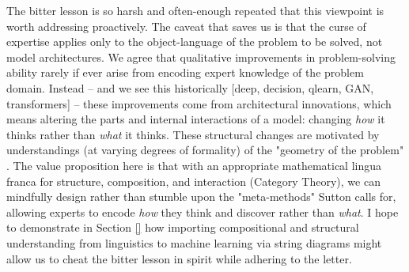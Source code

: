 
The bitter lesson is so harsh and often-enough repeated that this viewpoint is worth addressing proactively. The caveat that saves us is that the curse of expertise applies only to the object-language of the problem to be solved, not model architectures. We agree that qualitative improvements in problem-solving ability rarely if ever arise from encoding expert knowledge of the problem domain. Instead -- and we see this historically \citep{}[deep, decision, qlearn, GAN, transformers] -- these improvements come from architectural innovations, which means altering the parts and internal interactions of a model: changing \emph{how} it thinks rather than \emph{what} it thinks. These structural changes are motivated by understandings (at varying degrees of formality) of the "geometry of the problem" \citep{}. The value proposition here is that with an appropriate mathematical lingua franca for structure, composition, and interaction (Category Theory), we can mindfully design rather than stumble upon the "meta-methods" Sutton calls for, allowing experts to encode \emph{how} they think and discover rather than \emph{what}. I hope to demonstrate in Section \ref{} how importing compositional and structural understanding from linguistics to machine learning via string diagrams might allow us to cheat the bitter lesson in spirit while adhering to the letter.


